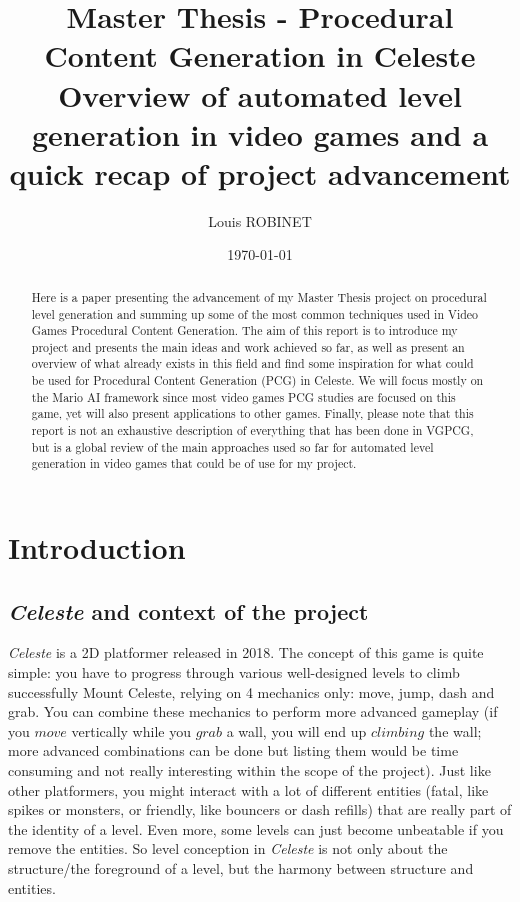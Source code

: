 \documentclass{article}
\title{Master Thesis - Procedural Content Generation in Celeste\\ Overview of automated level generation in video games and a quick recap of project advancement}
\author{Louis ROBINET}
\date{\today}
\newcommand{\Celeste}{\textit{Celeste} }
\begin{document}
\maketitle

\begin{abstract}
Here is a paper presenting the advancement of my Master Thesis project on procedural level generation and summing up some of the most common techniques used in Video Games Procedural Content Generation. The aim of this report is to introduce my project and presents the main ideas and work achieved so far, as well as present an overview of what already exists in this field and find some inspiration for what could be used for Procedural Content Generation (PCG) in Celeste. We will focus mostly on the Mario AI framework since most video games PCG studies are focused on this game, yet will also present applications to other games. Finally, please note that this report is not an exhaustive description of everything that has been done in VGPCG, but is a global review of the main approaches used so far for automated level generation in video games that could be of use for my project.
\end{abstract}

\newpage
\tableofcontents
\newpage

\section{Introduction}
\subsection{\Celeste and context of the project}
\Celeste is a 2D platformer released in 2018. The concept of this game is quite simple: you have to progress through various well-designed levels to climb successfully Mount Celeste, relying on 4 mechanics only: move, jump, dash and grab. You can combine these mechanics to perform more advanced gameplay (if you $\textit{move}$ vertically while you $\textit{grab}$ a wall, you will end up $\textit{climbing}$ the wall; more advanced combinations can be done but listing them would be time consuming and not really interesting within the scope of the project). Just like other platformers, you might interact with a lot of different entities (fatal, like spikes or monsters, or friendly, like bouncers or dash refills) that are really part of the identity of a level. Even more, some levels can just become unbeatable if you remove the entities. So level conception in \Celeste is not only about the structure/the foreground of a level, but the harmony between structure and entities.
\end{document}
